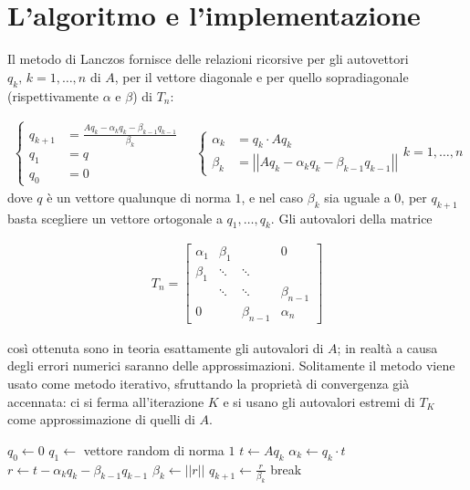\documentclass[11pt]{article}
\numberwithin{equation}{subsection}
\theoremstyle{connome}
\theoremstyle{connomesenzanumero}
\theoremstyle{connome+}
\theoremstyle{connomesenzanumero+}
\newcommand{\norm}[1]{\ensuremath{\left|\left|#1\right|\right|}}
\begin{document}
\section{L'algoritmo e l'implementazione}
\label{sec-2}
Il metodo di Lanczos fornisce delle relazioni ricorsive per gli autovettori $q_k, \, k=1, \ldots, n$ di $A$, per il vettore diagonale e per quello sopradiagonale (rispettivamente $\alpha$ e $\beta$) di $T_n$:

\begin{align}
\label{relaz}
\left\{
\begin{array}{ll}
q_{k+1} &= \frac{Aq_k -\alpha_k q_k - \beta_{k-1}q_{k-1}}{\beta_k} \\
q_1 &= q \\
q_0 &= 0
\end{array}
\right.
\quad \left\{
\begin{array}{ll}
\alpha_k &= q_k \cdot A q_k \\
\beta_k &= \norm{Aq_k -\alpha_k q_k - \beta_{k-1}q_{k-1}}
\end{array}
\right.
k=1, \ldots, n
\end{align}
dove $q$ è un vettore qualunque di norma $1$, e nel caso $\beta_k$ sia uguale a $0$, per $q_{k+1}$ basta scegliere un vettore ortogonale a $q_1,\ldots, q_k$.
Gli autovalori della matrice 

\begin{align*}
T_n = \begin{bmatrix}
\alpha_1 & \beta_1 & & 0\\
\beta_1 & \ddots & \ddots & \\
& \ddots & \ddots & \beta_{n-1} \\
0 & & \beta_{n-1} & \alpha_n
\end{bmatrix}
\end{align*}

così ottenuta sono in teoria esattamente gli autovalori di $A$; in realtà a causa degli errori numerici saranno delle approssimazioni. Solitamente il metodo viene usato come metodo iterativo, sfruttando la proprietà di convergenza già accennata: ci si ferma all'iterazione $K$ e si usano gli autovalori estremi di $T_K$ come approssimazione di quelli di $A$.

\begin{algorithm} 
\caption{}
\label{algo}
\begin{algorithmic}
\State $q_0 \gets 0$
\State $q_1 \gets$ vettore random di norma $1$
\State $t \gets A q_k$
\State $\alpha_k \gets q_k \cdot t$
\State $r \gets t - \alpha_k q_k - \beta_{k-1}q_{k-1}$
\State $\beta_{k} \gets \norm{r}$
\State $q_{k+1} \gets \frac{r}{\beta_k}$
\Else 
\State break
\EndIf
\EndIf
\EndFor
\end{algorithmic}
\end{algorithm}
\end{document}

